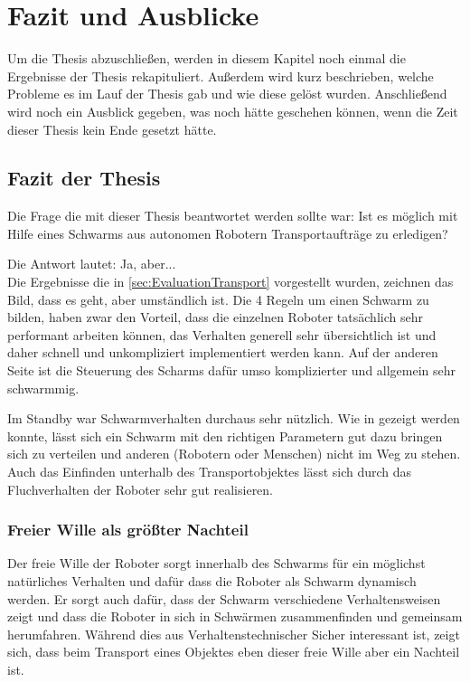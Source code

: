 \chapter{Fazit und Ausblicke}

Um die Thesis abzuschließen, werden in diesem Kapitel noch einmal die Ergebnisse der Thesis rekapituliert. Außerdem wird kurz beschrieben, welche Probleme es im Lauf der Thesis gab und wie diese gelöst wurden. Anschließend wird noch ein Ausblick gegeben, was noch hätte geschehen können, wenn die Zeit dieser Thesis kein Ende gesetzt hätte.

\section{Fazit der Thesis}

Die Frage die mit dieser Thesis beantwortet werden sollte war: Ist es möglich mit Hilfe eines Schwarms aus autonomen Robotern Transportaufträge zu erledigen?

Die Antwort lautet: Ja, aber...\\

Die Ergebnisse die in \autoref{sec:EvaluationTransport} vorgestellt wurden, zeichnen das Bild, dass es geht, aber umständlich ist. Die 4 Regeln um einen Schwarm zu bilden, haben zwar den Vorteil, dass die einzelnen Roboter tatsächlich sehr performant arbeiten können, das Verhalten generell sehr übersichtlich ist und daher schnell und unkompliziert implementiert werden kann. Auf der anderen Seite ist die Steuerung des Scharms dafür umso komplizierter und allgemein sehr schwarmmig.

Im Standby war Schwarmverhalten durchaus sehr nützlich. Wie in  gezeigt werden konnte, lässt sich ein Schwarm mit den richtigen Parametern gut dazu bringen sich zu verteilen und anderen (Robotern oder Menschen) nicht im Weg zu stehen. Auch das Einfinden unterhalb des Transportobjektes lässt sich durch das Fluchverhalten der Roboter sehr gut realisieren.

\subsection*{Freier Wille als größter Nachteil}
Der freie Wille der Roboter sorgt innerhalb des Schwarms für ein möglichst natürliches Verhalten und dafür dass die Roboter als Schwarm dynamisch werden. Er sorgt auch dafür, dass der Schwarm verschiedene Verhaltensweisen zeigt und dass die Roboter in sich in Schwärmen zusammenfinden und gemeinsam herumfahren. Während dies aus Verhaltenstechnischer Sicher interessant ist, zeigt sich, dass beim Transport eines Objektes eben dieser freie Wille aber ein Nachteil ist.


